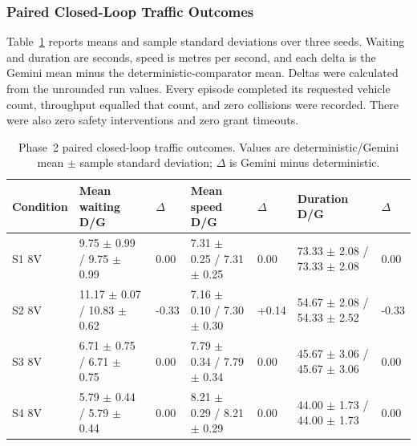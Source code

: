 \documentclass[letterpaper,10pt,conference]{ieeeconf}
\begin{document}
\subsubsection{Paired Closed-Loop Traffic Outcomes}



Table~\ref{tab:phase2_traffic} reports means and sample standard deviations over three seeds. Waiting and duration are seconds, speed is metres per second, and each delta is the Gemini mean minus the deterministic-comparator mean. Deltas were calculated from the unrounded run values. Every episode completed its requested vehicle count, throughput equalled that count, and zero collisions were recorded. There were also zero safety interventions and zero grant timeouts.

\begin{table}[t]

\centering

\caption{Phase~2 paired closed-loop traffic outcomes. Values are deterministic/Gemini mean $\pm$ sample standard deviation; $\Delta$ is Gemini minus deterministic.}

\label{tab:phase2_traffic}

\renewcommand{\arraystretch}{1.08}

\scriptsize

\begin{tabular}{p{1.15cm} p{2.65cm} p{0.72cm} p{2.65cm} p{0.72cm} p{2.65cm} p{0.72cm}}

\toprule

\textbf{Condition} & \textbf{Mean waiting D/G} & \textbf{$\Delta$} & \textbf{Mean speed D/G} & \textbf{$\Delta$} & \textbf{Duration D/G} & \textbf{$\Delta$} \\

\midrule

S1 8V & 9.75 $\pm$ 0.99 / 9.75 $\pm$ 0.99 & 0.00 & 7.31 $\pm$ 0.25 / 7.31 $\pm$ 0.25 & 0.00 & 73.33 $\pm$ 2.08 / 73.33 $\pm$ 2.08 & 0.00 \\

S2 8V & 11.17 $\pm$ 0.07 / 10.83 $\pm$ 0.62 & -0.33 & 7.16 $\pm$ 0.10 / 7.30 $\pm$ 0.30 & +0.14 & 54.67 $\pm$ 2.08 / 54.33 $\pm$ 2.52 & -0.33 \\

S3 8V & 6.71 $\pm$ 0.75 / 6.71 $\pm$ 0.75 & 0.00 & 7.79 $\pm$ 0.34 / 7.79 $\pm$ 0.34 & 0.00 & 45.67 $\pm$ 3.06 / 45.67 $\pm$ 3.06 & 0.00 \\

S4 8V & 5.79 $\pm$ 0.44 / 5.79 $\pm$ 0.44 & 0.00 & 8.21 $\pm$ 0.29 / 8.21 $\pm$ 0.29 & 0.00 & 44.00 $\pm$ 1.73 / 44.00 $\pm$ 1.73 & 0.00 \\


\end{tabular}
\end{table}
\end{document}

